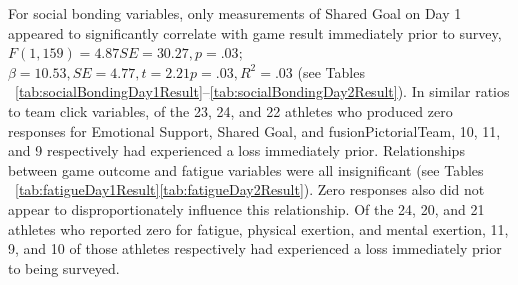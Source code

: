 \documentclass[12pt]{report}
\begin{document}
{For social bonding variables, only measurements of Shared Goal on Day 1 appeared to significantly correlate with game result immediately prior to survey, $F(1,159) = 4.87 SE = 30.27, p = .03$; $\beta = 10.53, SE = 4.77, t = 2.21 p = .03, R^2 = .03$ (see Tables ~\ref{tab:socialBondingDay1Result}\nobreakdash--\ref{tab:socialBondingDay2Result}). In similar ratios to team click variables, of the 23, 24, and 22 athletes who produced zero responses for Emotional Support, Shared Goal, and fusionPictorialTeam, 10, 11, and 9 respectively had experienced a loss immediately prior. Relationships between game outcome and fatigue variables were all insignificant (see Tables ~\ref{tab:fatigueDay1Result}\nobreakdash\ref{tab:fatigueDay2Result}).  Zero responses also did not appear to disproportionately influence this relationship. Of the 24, 20, and 21 athletes who reported zero for fatigue, physical exertion, and mental exertion, 11, 9, and 10 of those athletes respectively had experienced a loss immediately prior to being surveyed.











}
\end{document}
